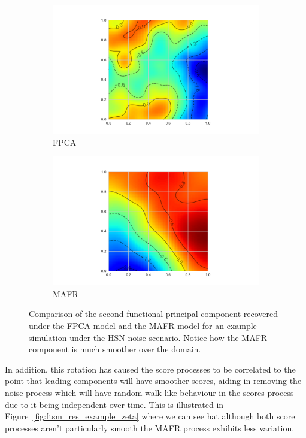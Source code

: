 \begin{figure}[!htbp]
	\centering
	\begin{subfigure}[b]{0.45\textwidth}
		\includegraphics[width=\textwidth]{ftsm_res_fpc_example_fpca}
		\caption{FPCA}
	\end{subfigure}             
	\begin{subfigure}[b]{0.45\textwidth}
		\includegraphics[width=\textwidth]{ftsm_res_fpc_example_mafr}
		\caption{MAFR}
	\end{subfigure}
	\caption[Comparison of the second functional principal component under FPCA and MAFR models.]{Comparison of the second functional principal component recovered under the FPCA model and the MAFR model for an example simulation under the HSN noise scenario. Notice how the MAFR component is much smoother over the domain.}
	\label{fig:ftsm_res_example_fpc}
\end{figure}

In addition, this rotation has caused the score processes to be correlated to the point that leading components will have smoother scores, aiding in removing the noise process which will have random walk like behaviour in the scores process due to it being independent over time.
This is illustrated in Figure~\ref{fig:ftsm_res_example_zeta} where we can see hat although both score processes aren't particularly smooth the MAFR process exhibits less variation. 

